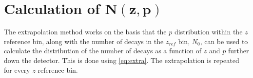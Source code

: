 
 
\FloatBarrier
  
\section[Calculation of $N(z,p)$]{Calculation of $\mathbold{N(z,p)}$}
\label{sec:extra}
The extrapolation method works on the basis that the $p$ distribution within the $z$ reference bin, along with the number of \KS decays in the $z_{ref}$ bin, $N_{0}$, can be used to calculate the distribution of the number of decays as a function of $z$ and $p$ further down the detector. This is done using \autoref{eq:extra}. The extrapolation is  repeated for every $z$ reference bin.%


